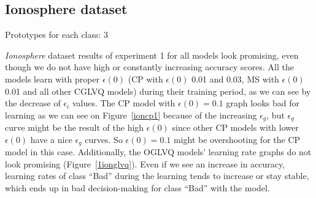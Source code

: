 \subsection{Ionosphere dataset}

Prototypes for each class: 3
\vspace{5pt}

\textit{Ionosphere} dataset results of experiment 1 for all models look promising, even though we do not have high or constantly increasing accuracy scores. All the models learn with proper $\epsilon(0)$ (CP with $\epsilon(0)$ 0.01 and 0.03, MS with $\epsilon(0)$ 0.01 and all other CGLVQ models) during their training period, as we can see by the decrease of $\epsilon_{i}$ values. The CP model with $\epsilon(0) = 0.1$ graph looks bad for learning as we can see on Figure~\ref{ioncp1} because of the increasing $\epsilon_{g}$, but $\epsilon_{g}$ curve might be the result of the high $\epsilon(0)$ since other CP models with lower $\epsilon(0)$ have a nice $\epsilon_{g}$ curves. So $\epsilon(0)= 0.1$ might be overshooting for the CP model in this case. Additionally, the OGLVQ models’ learning rate graphs do not look promising (Figure~\ref{1ionglvq}). Even if we see an increase in accuracy, learning rates of class “Bad” during the learning tends to increase or stay stable, which ends up in bad decision-making for class “Bad” with the model.



